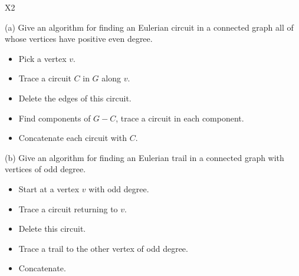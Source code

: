 \documentclass[8pt]{extarticle}
\begin{document}
  \begin{problem}{X2}
    \begin{problem}{(a)}
      Give an algorithm for finding an Eulerian circuit in a connected graph all of whose vertices have positive even degree.
      \tcblower
      \begin{itemize}
        \item Pick a vertex $v$.
        \item Trace a circuit $C$ in $G$ along $v$.
        \item Delete the edges of this circuit.
        \item Find components of $G-C$, trace a circuit in each component.
        \item Concatenate each circuit with $C$.
      \end{itemize}
    \end{problem}
    \begin{problem}{(b)}
      Give an algorithm for finding an Eulerian trail in a connected graph with vertices of odd degree.
      \tcblower
      \begin{itemize}
        \item Start at a vertex $v$ with odd degree.
        \item Trace a circuit returning to $v$.
        \item Delete this circuit.
        \item Trace a trail to the other vertex of odd degree.
        \item Concatenate.
      \end{itemize}
    \end{problem}
  \end{problem}
\end{document}
